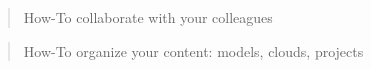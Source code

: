 \documentclass[a4paper,12pt,english]{sphinxmanual}
\begin{document}
\begin{sphinxShadowBox}
\begin{quote}

How-To collaborate with your colleagues
\end{quote}
\end{sphinxShadowBox}

\begin{sphinxShadowBox}
\begin{quote}

How-To organize your content: models, clouds, projects
\end{quote}
\end{sphinxShadowBox}

\begin{sphinxShadowBox}
\end{sphinxShadowBox}
\end{document}
